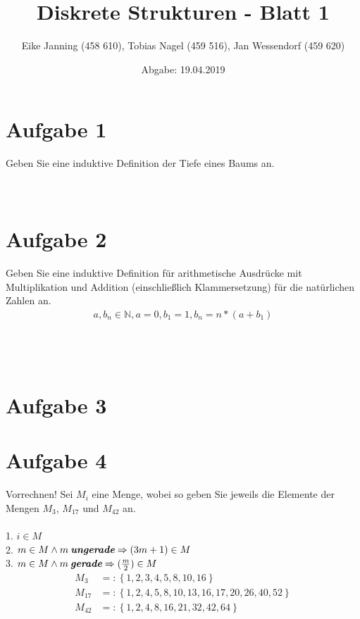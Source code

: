 \documentclass[11pt]{article}
\title{Diskrete Strukturen - Blatt 1}
\author{Eike Janning (458 610), Tobias Nagel (459 516), Jan Wessendorf (459 620)}
\date{Abgabe: 19.04.2019}
\begin{document}
\maketitle

\section*{Aufgabe 1}

Geben Sie eine induktive Definition der Tiefe eines Baums an.\\\\\\

\section*{Aufgabe 2}
	 Geben Sie eine induktive Definition für arithmetische Ausdrücke mit Multiplikation und Addition (einschließlich Klammersetzung) für die natürlichen Zahlen an.\\
	 	\begin{align*}
		 	a, b_n \in \mathbb{N}, a = 0, b_1 = 1, b_n = n*(a+b_1)
	 	\end{align*}\\\\\\

\section*{Aufgabe 3}
	
\pagebreak

\section*{Aufgabe 4} Vorrechnen!
Sei $M_i$ eine Menge, wobei  so geben Sie jeweils die Elemente der Mengen $M_3$, $M_{17}$ und $M_{42}$ an.\\\\
	1. $ i \in M$\\
	2. $m \in M \land m\: \textit{\textbf{ungerade}} \Rightarrow (3m+1) \in M$\\
	3. $m \in M \land m\: \textit{\textbf{gerade}} \Rightarrow (\frac{m}{2}) \in M$
		\begin{align*}
			M_3 &=: \left\{1,2,3,4,5,8,10,16\right\}\\
			M_{17} &=: \left\{1,2,4,5,8,10,13,16,17,20,26,40,52\right\}\\
			M_{42} &=: \left\{1,2,4,8,16,21,32,42,64\right\}
		\end{align*}\\\\\\
		
\end{document}
